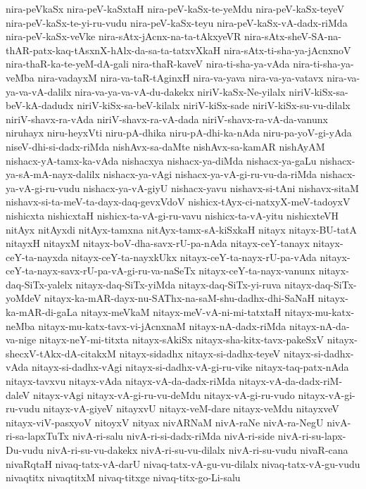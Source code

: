 {nira-peVkaSx
nira-peV-kaSxtaH
nira-peV-kaSx-te-yeMdu
nira-peV-kaSx-teyeV
nira-peV-kaSx-te-yi-ru-vudu
nira-peV-kaSx-teyu
nira-peV-kaSx-vA-dadx-riMda
nira-peV-kaSx-veVke
nira-sAtx-jAcnx-na-ta-tAkxyeVR
nira-sAtx-sheV-SA-na-thAR-patx-kaq-tAsxnX-hAlx-da-sa-ta-tatxvXkaH
nira-sAtx-ti-sha-ya-jAcnxnoV
nira-thaR-ka-te-yeM-dA-gali
nira-thaR-kaveV
nira-ti-sha-ya-vAda
nira-ti-sha-ya-veMba
nira-vadayxM
nira-va-taR-tAginxH
nira-va-yava
nira-va-ya-vatavx
nira-va-ya-va-vA-dalilx
nira-va-ya-va-vA-du-dakekx
niriV-kaSx-Ne-yilalx
niriV-kiSx-sa-beV-kA-dadudx
niriV-kiSx-sa-beV-kilalx
niriV-kiSx-sade
niriV-kiSx-su-vu-dilalx
niriV-shavx-ra-vAda
niriV-shavx-ra-vA-dada
niriV-shavx-ra-vA-da-vanunx
niruhayx
niru-heyxVti
niru-pA-dhika
niru-pA-dhi-ka-nAda
niru-pa-yoV-gi-yAda
niseV-dhi-si-dadx-riMda
nishAvx-sa-daMte
nishAvx-sa-kamAR
nishAyAM
nishacx-yA-tamx-ka-vAda
nishacxya
nishacx-ya-diMda
nishacx-ya-gaLu
nishacx-ya-sA-mA-nayx-dalilx
nishacx-ya-vAgi
nishacx-ya-vA-gi-ru-vu-da-riMda
nishacx-ya-vA-gi-ru-vudu
nishacx-ya-vA-giyU
nishacx-yavu
nishavx-si-tAni
nishavx-sitaM
nishavx-si-ta-meV-ta-dayx-daq-gevxVdoV
nishicx-tAyx-ci-natxyX-meV-tadoyxV
nishicxta
nishicxtaH
nishicx-ta-vA-gi-ru-vavu
nishicx-ta-vA-yitu
nishicxteVH
nitAyx
nitAyxdi
nitAyx-tamxna
nitAyx-tamx-sA-kiSxkaH
nitayx
nitayx-BU-tatA
nitayxH
nitayxM
nitayx-boV-dha-savx-rU-pa-nAda
nitayx-ceY-tanayx
nitayx-ceY-ta-nayxda
nitayx-ceY-ta-nayxkUkx
nitayx-ceY-ta-nayx-rU-pa-vAda
nitayx-ceY-ta-nayx-savx-rU-pa-vA-gi-ru-va-naSeTx
nitayx-ceY-ta-nayx-vanunx
nitayx-daq-SiTx-yalelx
nitayx-daq-SiTx-yiMda
nitayx-daq-SiTx-yi-ruva
nitayx-daq-SiTx-yoMdeV
nitayx-ka-mAR-dayx-nu-SAThx-na-saM-shu-dadhx-dhi-SaNaH
nitayx-ka-mAR-di-gaLa
nitayx-meVkaM
nitayx-meV-vA-ni-mi-tatxtaH
nitayx-mu-katx-neMba
nitayx-mu-katx-tavx-vi-jAcnxnaM
nitayx-nA-dadx-riMda
nitayx-nA-da-va-nige
nitayx-neY-mi-titxta
nitayx-sAkiSx
nitayx-sha-kitx-tavx-pakeSxV
nitayx-shecxV-tAkx-dA-citakxM
nitayx-sidadhx
nitayx-si-dadhx-teyeV
nitayx-si-dadhx-vAda
nitayx-si-dadhx-vAgi
nitayx-si-dadhx-vA-gi-ru-vike
nitayx-taq-patx-nAda
nitayx-tavxvu
nitayx-vAda
nitayx-vA-da-dadx-riMda
nitayx-vA-da-dadx-riM-daleV
nitayx-vAgi
nitayx-vA-gi-ru-vu-deMdu
nitayx-vA-gi-ru-vudo
nitayx-vA-gi-ru-vudu
nitayx-vA-giyeV
nitayxvU
nitayx-veM-dare
nitayx-veMdu
nitayxveV
nitayx-viV-pasxyoV
nitoyxV
nityax
nivARNaM
nivA-raNe
nivA-ra-NegU
nivA-ri-sa-lapxTuTx
nivA-ri-salu
nivA-ri-si-dadx-riMda
nivA-ri-side
nivA-ri-su-lapx-Du-vudu
nivA-ri-su-vu-dakekx
nivA-ri-su-vu-dilalx
nivA-ri-su-vudu
nivaR-cana
nivaRqtaH
nivaq-tatx-vA-darU
nivaq-tatx-vA-gu-vu-dilalx
nivaq-tatx-vA-gu-vudu
nivaqtitx
nivaqtitxM
nivaq-titxge
nivaq-titx-go-Li-salu
}
